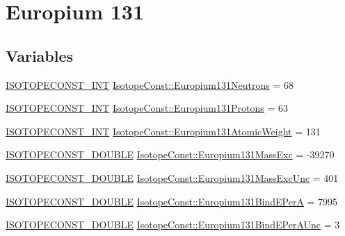 \hypertarget{group___isotope_const-_europium-_eu131}{}\section{Europium 131}
\label{group___isotope_const-_europium-_eu131}
\subsection*{Variables}
\begin{DoxyCompactItemize}
\item 
\mbox{\hyperlink{group___isotope_const-_macros_ga5f18360b3e99483a35c32d789e62621c}{I\+S\+O\+T\+O\+P\+E\+C\+O\+N\+S\+T\+\_\+\+I\+NT}} \mbox{\hyperlink{group___isotope_const-_europium-_eu131_ga86674c530dd8025c4c758211ceafe415}{Isotope\+Const\+::\+Europium131\+Neutrons}} = 68
\item 
\mbox{\hyperlink{group___isotope_const-_macros_ga5f18360b3e99483a35c32d789e62621c}{I\+S\+O\+T\+O\+P\+E\+C\+O\+N\+S\+T\+\_\+\+I\+NT}} \mbox{\hyperlink{group___isotope_const-_europium-_eu131_ga27fd2685383f7e273e383605ec65302d}{Isotope\+Const\+::\+Europium131\+Protons}} = 63
\item 
\mbox{\hyperlink{group___isotope_const-_macros_ga5f18360b3e99483a35c32d789e62621c}{I\+S\+O\+T\+O\+P\+E\+C\+O\+N\+S\+T\+\_\+\+I\+NT}} \mbox{\hyperlink{group___isotope_const-_europium-_eu131_ga5c5ec30ced44a41c1dda84784c7546c1}{Isotope\+Const\+::\+Europium131\+Atomic\+Weight}} = 131
\item 
\mbox{\hyperlink{group___isotope_const-_macros_ga8f45a7272ce02c0b4c65c44636ed719a}{I\+S\+O\+T\+O\+P\+E\+C\+O\+N\+S\+T\+\_\+\+D\+O\+U\+B\+LE}} \mbox{\hyperlink{group___isotope_const-_europium-_eu131_gaf8d09721fb843676f7e95c020a8d1511}{Isotope\+Const\+::\+Europium131\+Mass\+Exc}} = -\/39270
\item 
\mbox{\hyperlink{group___isotope_const-_macros_ga8f45a7272ce02c0b4c65c44636ed719a}{I\+S\+O\+T\+O\+P\+E\+C\+O\+N\+S\+T\+\_\+\+D\+O\+U\+B\+LE}} \mbox{\hyperlink{group___isotope_const-_europium-_eu131_gabe03e189f50890663573791475f56f5f}{Isotope\+Const\+::\+Europium131\+Mass\+Exc\+Unc}} = 401
\item 
\mbox{\hyperlink{group___isotope_const-_macros_ga8f45a7272ce02c0b4c65c44636ed719a}{I\+S\+O\+T\+O\+P\+E\+C\+O\+N\+S\+T\+\_\+\+D\+O\+U\+B\+LE}} \mbox{\hyperlink{group___isotope_const-_europium-_eu131_ga9b725254fc0526bef875edfd93da4682}{Isotope\+Const\+::\+Europium131\+Bind\+E\+PerA}} = 7995
\item 
\mbox{\hyperlink{group___isotope_const-_macros_ga8f45a7272ce02c0b4c65c44636ed719a}{I\+S\+O\+T\+O\+P\+E\+C\+O\+N\+S\+T\+\_\+\+D\+O\+U\+B\+LE}} \mbox{\hyperlink{group___isotope_const-_europium-_eu131_ga26c113c009aef2a8b762d3ef170b0cb5}{Isotope\+Const\+::\+Europium131\+Bind\+E\+Per\+A\+Unc}} = 3

\end{DoxyCompactItemize}
